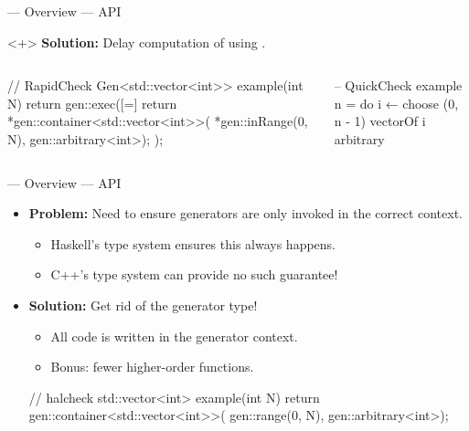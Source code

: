 \begin{frame}[fragile,t]{\halcheck{} --- Overview --- API}
  \begin{onlyenv}<+>
    \textbf{Solution:} Delay computation of  using .

    \begin{columns}[T,onlytextwidth]
      \begin{cppcode}
        // RapidCheck
        Gen<std::vector<int>> example(int N) {
          return gen::exec([=] {
            return *gen::container<std::vector<int>>(
              *gen::inRange(0, N),
              gen::arbitrary<int>);
          });
        }
      \end{cppcode}

      \begin{haskellcode}
        -- QuickCheck
        example n = do
          i ← choose (0, n - 1)
          vectorOf i arbitrary
      \end{haskellcode}
    \end{columns}
  \end{onlyenv}
\end{frame}

\begin{frame}[fragile]{\halcheck{} --- Overview --- API}
  \begin{itemize}
    \item \textbf{Problem:} Need to ensure generators are only invoked in the correct context.
          \begin{itemize}
            \item Haskell's type system ensures this always happens.
            \item C++'s type system can provide no such guarantee!
          \end{itemize}
          \pause{}
    \item \textbf{Solution:} Get rid of the generator type!
          \begin{itemize}
            \item All code is written in the generator context.
            \item Bonus: fewer higher-order functions.
          \end{itemize}
          \begin{cppcode}
            // halcheck
            std::vector<int> example(int N) {
              return gen::container<std::vector<int>>(
                gen::range(0, N),
                gen::arbitrary<int>);
            }
          \end{cppcode}
  \end{itemize}
\end{frame}

